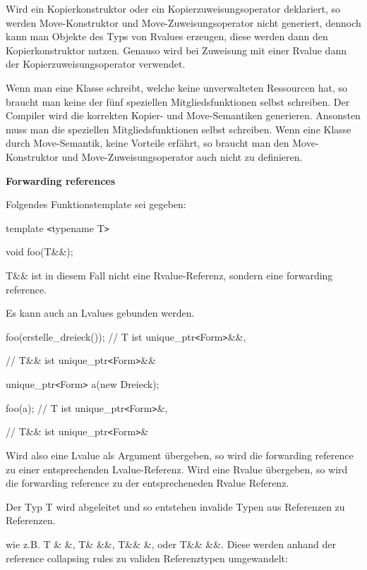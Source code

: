 \documentclass{article}
\begin{document}
\vspace{220pt}
Wird ein Kopierkonstruktor oder ein Kopierzuweisungsoperator deklariert, so werden 
Move-Konstruktor und Move-Zuweisungsoperator nicht generiert, dennoch kann man 
Objekte des Typs von Rvalues erzeugen, diese werden dann den Kopierkonstruktor 
nutzen. Genauso wird bei Zuweisung mit einer Rvalue dann der Kopierzuweisungsoperator 
verwendet.

Wenn man eine Klasse schreibt, welche keine unverwalteten Ressourcen hat, so braucht 
man keine der fünf speziellen Mitgliedsfunktionen selbst schreiben. Der Compiler 
wird die korrekten Kopier- und Move-Semantiken generieren. Ansonsten muss man die 
speziellen Mitgliedsfunktionen selbst schreiben. Wenn eine Klasse durch Move-Semantik, 
keine Vorteile erfährt, so braucht man den Move-Konstruktor und Move-Zuweisungsoperator 
auch nicht zu definieren.

\vspace{12pt}
\textbf{Forwarding references}

Folgendes Funktionstemplate sei gegeben:

template \texttt{<}typename T\texttt{>}

void foo(T\&\&);

T\&\& ist in diesem Fall nicht eine Rvalue-Referenz, sondern eine forwarding reference.

Es kann auch an Lvalues gebunden werden.

foo(erstelle\_dreieck()); // T ist unique\_ptr\texttt{<}Form\texttt{>}\&\&,    
                     

\parindent=90pt
// T\&\& ist unique\_ptr\texttt{<}Form\texttt{>}\&\&

\parindent=0pt
unique\_ptr\texttt{<}Form\texttt{>} a(new Dreieck);

foo(a); // T ist unique\_ptr\texttt{<}Form\texttt{>}\&,        

\parindent=28pt
// T\&\& ist unique\_ptr\texttt{<}Form\texttt{>}\&

\parindent=0pt
Wird also eine Lvalue als Argument übergeben, so wird die forwarding reference 
zu einer entsprechenden Lvalue-Referenz. Wird eine Rvalue übergeben, so wird die 
forwarding reference zu der entsprecheneden Rvalue Referenz.

Der Typ T wird abgeleitet und so entstehen invalide Typen aus Referenzen zu Referenzen.

wie z.B. T \& \&, T\& \&\&, T\&\& \&, oder T\&\& \&\&. Diese werden anhand der 
reference collapsing rules zu validen Referenztypen umgewandelt:
\end{document}
